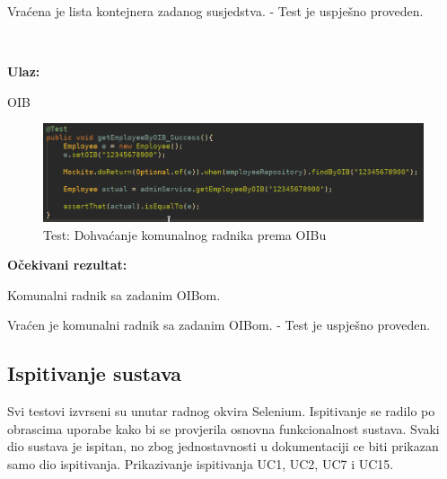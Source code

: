 			Vraćena je lista kontejnera zadanog susjedstva. - Test je uspješno proveden.			


						
			\noindent {}
			
			\
			
			\noindent \textbf{Ulaz:}
			
			\begin{packed_enum}
				\item OIB 
					
				
			\end{packed_enum}

			\begin{figure}[H]
					\includegraphics[scale=0.57]{figures/Screenshot_20200115_224135.PNG}
					\centering
					\caption{Test: Dohvaćanje komunalnog radnika prema OIBu}
					\label{fig:Dohvaćanje komunalnog radnika prema OIBu}
				\end{figure}	
			
			\noindent \textbf{Očekivani rezultat:}
				\begin{packed_enum}
				\item Komunalni radnik sa zadanim OIBom.
							
				
			\end{packed_enum}
			
		
			Vraćen je komunalni radnik sa zadanim OIBom. - Test je uspješno proveden.			

			
			
			\subsection{Ispitivanje sustava}
			
			Svi testovi izvrseni su unutar radnog okvira Selenium. Ispitivanje se radilo po obrascima uporabe kako bi se provjerila osnovna funkcionalnost sustava. Svaki dio sustava je ispitan, no zbog jednostavnosti u dokumentaciji ce biti prikazan samo dio ispitivanja. Prikazivanje ispitivanja UC1, UC2, UC7 i UC15. \\\


